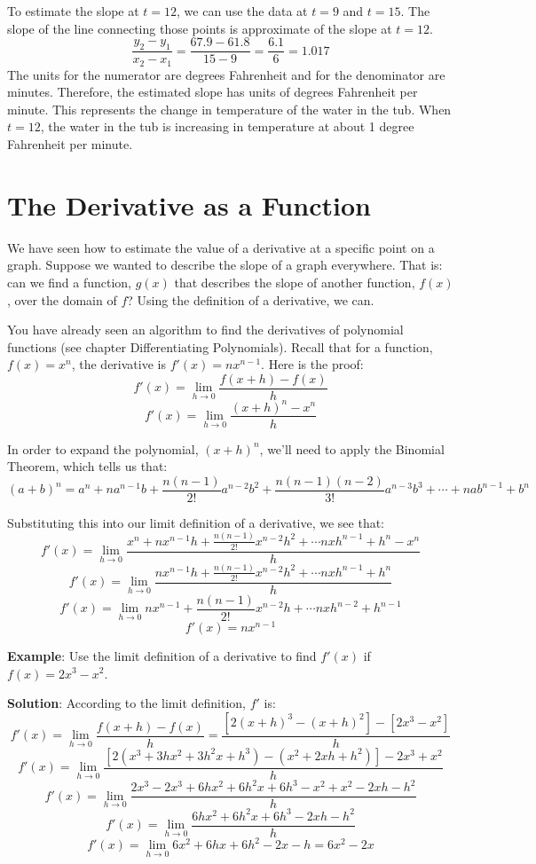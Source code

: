 \begin{Answer}[ref=slope1]
	To estimate the slope at $t = 12$, we can use the data at $t = 9$ and $t = 
	15$. The slope of the line connecting those points is approximate of the 
	slope at $t = 12$. $$\frac{y_2 - y_1}{x_2 - x_1} = \frac{67.9 - 61.8}{15 - 9} 
	= \frac{6.1}{6} = 1.017$$ The units for the numerator are degrees Fahrenheit 
	and for the denominator are minutes. Therefore, the estimated slope has units 
	of degrees Fahrenheit per minute. This represents the change in temperature 
	of the water in the tub. When $t = 12$, the water in the tub is increasing in 
	temperature at about 1 degree Fahrenheit per minute. 
\end{Answer}

\section{The Derivative as a Function}
We have seen how to estimate the value of a derivative at a specific point on 
a graph. Suppose we wanted to describe the slope of a graph everywhere. That 
is: can we find a function, $g(x)$ that describes the slope of another 
function, $f(x)$, over the domain of $f$? Using the definition of a 
derivative, we can.

You have already seen an algorithm to find the derivatives of polynomial 
functions (see chapter Differentiating Polynomials). Recall that for a 
function, $f(x) = x^n$, the derivative is $f'(x) = nx^{n - 1}$. Here is the 
proof:
$$f'(x) = \lim_{h \to 0} \frac{f(x + h) - f(x)}{h}$$
$$f'(x) = \lim_{h \to 0} \frac{(x + h)^n - x^n}{h}$$

In order to expand the polynomial, $(x + h)^n$, we'll need to apply the 
Binomial Theorem, which tells us that:
$$(a + b)^n = a^n + na^{n - 1}b + \frac{n(n - 1)}{2!}a^{n - 2}b^2 + \frac{n(n 
- 1)(n - 2)}{3!}a^{n - 3}b^3 + \cdots + nab^{n - 1} + b^n$$

Substituting this into our limit definition of a derivative, we see that:
$$f'(x) = \lim_{h \to 0} \frac{x^n + nx^{n-1}h + \frac{n(n-1)}{2!}x^{n-2}h^2 
+ \cdots nxh^{n-1} + h^n - x^n}{h}$$
$$f'(x) = \lim_{h \to 0} \frac{nx^{n-1}h + \frac{n(n-1)}{2!}x^{n-2}h^2 + 
\cdots nxh^{n-1} + h^n}{h}$$
$$f'(x) = \lim_{h \to 0} nx^{n-1} + \frac{n(n-1)}{2!}x^{n-2}h + \cdots nxh^{
n-2} + h^{n-1}$$
$$f'(x) = nx^{n-1}$$

\textbf{Example}: Use the limit definition of a derivative to find $f'(x)$ if 
$f(x) = 2x^3 - x^2$. 

\textbf{Solution}: According to the limit definition, $f'$ is:
$$f'(x) = \lim_{h \to 0} \frac{f(x + h) - f(x)}{h} = \frac{\left[ 2\left( x + 
h \right)^3 - \left( x + h \right)^2 \right] - \left[ 2x^3 - x^2 \right]}{h}$$
$$f'(x) = \lim_{h \to 0} \frac{\left[ 2 \left( x^3 + 3 h x^2 + 3 h^2 x + h^3 
\right) - \left( x^2 + 2xh + h^2 \right) \right] - 2 x^3 + x^2}{h}$$
$$f'(x) = \lim_{h \to 0} \frac{2x^3 - 2x^3 + 6 h x^2 + 6 h^2 x + 6 h^3 - x^2 + 
x^2 -2 x h - h^2}{h}$$
$$f'(x) = \lim_{h \to 0} \frac{6 h x^2 + 6 h^2 x + 6 h^3 - 2 x h - h^2}{h}$$
$$f'(x) = \lim_{h \to 0} 6 x^2 + 6 h x + 6 h^2 - 2x - h = 6 x^2 - 2 x$$

